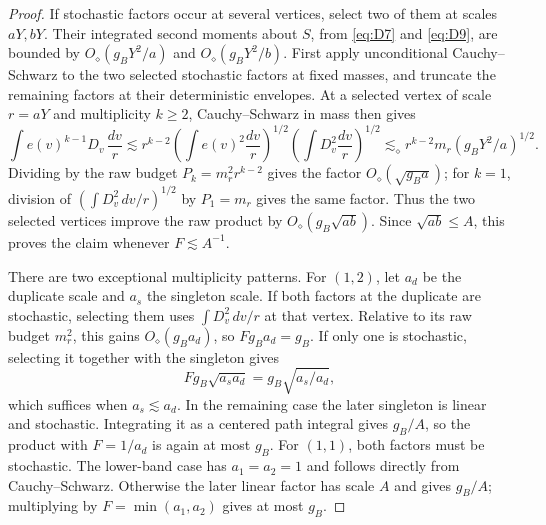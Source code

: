 \begin{proof}
If stochastic factors occur at several vertices, select two of them
at scales \(aY,bY\). Their integrated second moments about \(S\), from
\eqref{eq:D7} and \eqref{eq:D9}, are bounded by
\(O_\diamond(g_BY^2/a)\) and \(O_\diamond(g_BY^2/b)\).
First apply unconditional Cauchy--Schwarz to the two selected stochastic
factors at fixed masses, and truncate the remaining factors at their
deterministic envelopes. At a selected vertex of scale \(r=aY\)
and multiplicity \(k\ge2\), Cauchy--Schwarz in mass then gives
\[
 \int e(v)^{k-1}D_v\,\frac{dv}{r}
 \lesssim r^{k-2}
    \left(\int e(v)^2\frac{dv}{r}\right)^{1/2}
    \left(\int D_v^2\frac{dv}{r}\right)^{1/2}
 \lesssim_\diamond r^{k-2}m_r
                 (g_BY^2/a)^{1/2}.
\]
Dividing by the raw budget \(P_k=m_r^2r^{k-2}\) gives the factor
\(O_\diamond(\sqrt{g_Ba})\); for \(k=1\), division of
\((\int D_v^2\,dv/r)^{1/2}\) by \(P_1=m_r\) gives the same
factor. Thus the two selected vertices improve the raw product by
\(O_\diamond(g_B\sqrt{ab})\). Since \(\sqrt{ab}\le A\),
this proves the claim whenever \(F\lesssim A^{-1}\).

There are two exceptional multiplicity patterns. For \((1,2)\), let
\(a_d\) be the duplicate scale and \(a_s\) the singleton scale. If both
factors at the duplicate are stochastic, selecting them uses
\(\int D_v^2\,dv/r\) at that vertex. Relative to its raw budget
\(m_r^2\), this gains \(O_\diamond(g_Ba_d)\), so
\(F g_Ba_d=g_B\). If only one is stochastic, selecting it together
with the singleton gives
\[
 Fg_B\sqrt{a_sa_d}=g_B\sqrt{a_s/a_d},
\]
which suffices when \(a_s\lesssim a_d\). In the remaining case the
later singleton is linear and stochastic. Integrating it as a centered
path integral gives \(g_B/A\), so the product with \(F=1/a_d\) is
again at most \(g_B\). For \((1,1)\), both factors must be stochastic.
The lower-band case has \(a_1=a_2=1\) and follows directly from
Cauchy--Schwarz. Otherwise the later linear factor has scale \(A\)
and gives \(g_B/A\); multiplying by
\(F=\min(a_1,a_2)\) gives at most \(g_B\).


\end{proof}
